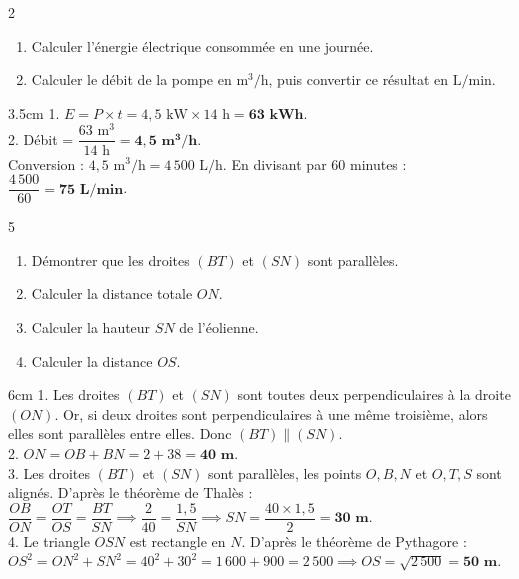 \documentclass[a4paper]{book}
\begin{document}
{        \begin{exerciceNote}{2}
        \begin{enumerate}
            \item Calculer l'énergie électrique consommée en une journée.
            \item Calculer le débit de la pompe en $\text{m}^3/\text{h}$, puis convertir ce résultat en $\text{L/min}$.
        \end{enumerate}
        \begin{ZoneReponse}{3.5cm}
        1. $E = P \times t = 4,5\text{ kW} \times 14\text{ h} = \mathbf{63\text{ kWh}}$. \\
        2. Débit = $\dfrac{63\text{ m}^3}{14\text{ h}} = \mathbf{4,5\text{ m}^3/\text{h}}$. \\
        \phantom{2. }Conversion : $4,5\text{ m}^3/\text{h} = 4\,500\text{ L/h}$. En divisant par $60$ minutes : $\dfrac{4\,500}{60} = \mathbf{75\text{ L/min}}$.
        \end{ZoneReponse}
    \end{exerciceNote}
    
    
\newpage

    
    \begin{exerciceNote}{5}
        \begin{enumerate}
            \item Démontrer que les droites $(BT)$ et $(SN)$ sont parallèles.
            \item Calculer la distance totale $ON$.
            \item Calculer la hauteur $SN$ de l'éolienne.
            \item Calculer la distance $OS$.
        \end{enumerate}
        \begin{ZoneReponse}{6cm}
        1. Les droites $(BT)$ et $(SN)$ sont toutes deux perpendiculaires à la droite $(ON)$. Or, si deux droites sont perpendiculaires à une même troisième, alors elles sont parallèles entre elles. Donc \textbf{$(BT) \parallel (SN)$}. \\
        2. $ON = OB + BN = 2 + 38 = \mathbf{40\text{ m}}$. \\
        3. Les droites $(BT)$ et $(SN)$ sont parallèles, les points $O,B,N$ et $O,T,S$ sont alignés. D'après le théorème de Thalès : $\dfrac{OB}{ON} = \dfrac{OT}{OS} = \dfrac{BT}{SN} \implies \dfrac{2}{40} = \dfrac{1,5}{SN} \implies SN = \dfrac{40 \times 1,5}{2} = \mathbf{30\text{ m}}$. \\
        4. Le triangle $OSN$ est rectangle en $N$. D'après le théorème de Pythagore : \\
        \phantom{4. }$OS^2 = ON^2 + SN^2 = 40^2 + 30^2 = 1\,600 + 900 = 2\,500 \implies OS = \sqrt{2\,500} = \mathbf{50\text{ m}}$.
        \end{ZoneReponse}
    \end{exerciceNote}

}
\end{document}
